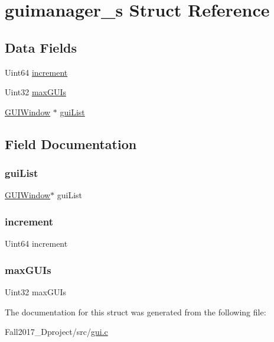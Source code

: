\hypertarget{structguimanager__s}{}\section{guimanager\+\_\+s Struct Reference}
\label{structguimanager__s}
\subsection*{Data Fields}
\begin{DoxyCompactItemize}
\item 
Uint64 \hyperlink{structguimanager__s_ab08657e2d8ce2eb598d448722ef0959b}{increment}
\item 
Uint32 \hyperlink{structguimanager__s_a74f8a2d00fbe7d37b7561bafc55e54c2}{max\+G\+U\+Is}
\item 
\hyperlink{gui_8h_a99b9d7cca33b027a6be098de1de11ddc}{G\+U\+I\+Window} $\ast$ \hyperlink{structguimanager__s_ab4b2fa244546531438ab1e3d2aa6d403}{gui\+List}
\end{DoxyCompactItemize}


\subsection{Field Documentation}
\mbox{\label{structguimanager__s_ab4b2fa244546531438ab1e3d2aa6d403}} 
\subsubsection{\texorpdfstring{gui\+List}{guiList}}
{\footnotesize\ttfamily \hyperlink{gui_8h_a99b9d7cca33b027a6be098de1de11ddc}{G\+U\+I\+Window}$\ast$ gui\+List}

\mbox{\label{structguimanager__s_ab08657e2d8ce2eb598d448722ef0959b}} 
\subsubsection{\texorpdfstring{increment}{increment}}
{\footnotesize\ttfamily Uint64 increment}

\mbox{\label{structguimanager__s_a74f8a2d00fbe7d37b7561bafc55e54c2}} 
\subsubsection{\texorpdfstring{max\+G\+U\+Is}{maxGUIs}}
{\footnotesize\ttfamily Uint32 max\+G\+U\+Is}



The documentation for this struct was generated from the following file\+:\begin{DoxyCompactItemize}
\item 
Fall2017\+\_\+Dproject/src/\hyperlink{gui_8c}{gui.\+c}\end{DoxyCompactItemize}
